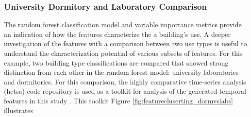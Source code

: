 \subsubsection{University Dormitory and Laboratory Comparison}
\label{sec:dormvslab}

The random forest classification model and variable importance metrics provide an indication of how the features characterize the a building's use. A deeper investigation of the features with a comparison between two use types is useful to understand the characterization potential of various subsets of features. For this example, two building type classifications are compared that showed strong distinction from each other in the random forest model: university laboratories and dormitories. For this comparison, the highly comparative time-series analysis (hctsa) code repository is used as a toolkit for analysis of the generated temporal features in this study \cite{Fulcher_2013}. This toolkit  Figure \ref{fig:featurecluserting_dormvslabs} illustrates